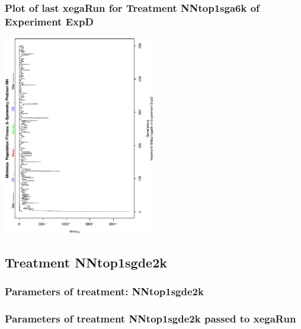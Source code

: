 \documentclass[18pt,c]{beamer}
\makeatletter
\def\beamer@writeslidentry@miniframesoff{%
  \expandafter\beamer@ifempty\expandafter{\beamer@framestartpage}{}%
  {%
   \clearpage\beamer@notesactions%
  }
}
\newcommand*{\miniframesoff}{\let\beamer@writeslidentry=\beamer@writeslidentry@miniframesoff}
\makeatother
\begin{document}
 \begin{frame}
 \frametitle{ Plot of last xegaRun for Treatment NNtop1sga6k of Experiment ExpD }
 \begin{center}
\includegraphics[width=0.5\textwidth, angle=-90]
{ExpDPlotPopStatsFigure004.eps}
 \end{center}
 \label{report/ExpDPlotPopStatsFigure004.eps}  
 \end{frame}

\miniframesoff
\subsection{Treatment NNtop1sgde2k}

 \begin{frame}
 \fontsize{8pt}{9pt}\selectfont
 \frametitle{  Parameters of treatment: NNtop1sgde2k 
 }

 \label{ExpDtParmTable015.tex}  
 \end{frame}


 \begin{frame}
 \fontsize{8pt}{9pt}\selectfont
 \frametitle{  Parameters of treatment NNtop1sgde2k passed to xegaRun
 }

 \label{ExpDtParmTable016.tex}  
 \end{frame}
\end{document}
